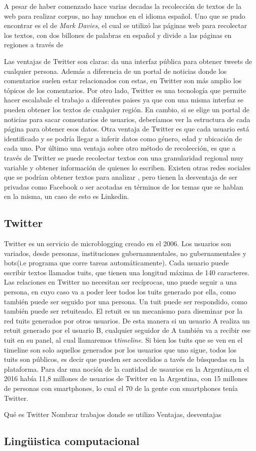 A pesar de haber comenzado hace varias decadas la recolección de textos de la web para realizar corpus, no hay muchos en el idioma español.
Uno que se pudo encontrar es el de \textit{Mark Davies}, el cual se utilizó las páginas web para recolectar los textos, con dos billones de palabras en español y divide a las páginas en regiones a través de  

Las ventajas de Twitter son claras: da una interfaz pública para obtener tweets de cualquier persona. Además a diferencia de un portal de noticias donde los comentarios suelen estar relacionados con estas, en Twitter son más amplio los tópicos de los comentarios.
Por otro lado, Twitter es una tecnología que permite hacer escalabale el trabajo a diferentes paises ya que con una misma interfaz se pueden obtener los textos de cualquier región. En cambio, si se elige un portal de noticias para sacar comentarios de usuarios, deberíamos ver la estructura de cada página para obtener esos datos.
Otra ventaja de Twitter es que cada usuario está identificado y se podría llegar a inferir datos como género, edad y ubicación de cada uno.
Por último una ventaja sobre otro método de recolección, es que a través de Twitter se puede recolectar textos con una granularidad regional muy variable y obtener información de quienes lo escriben.
Existen otras redes sociales que se podrían obtener textos para analizar , pero tienen la desventaja de ser privadas como Facebook o ser acotadas en términos de los temas que se hablan en la misma, un caso de esto es Linkedin. 


\subsection{Twitter}
Twitter es un servicio de microblogging creado en el 2006. Los usuarios son variados, desde personas, instituciones gubernamuentales, no gubernamentales y bots(i.e programa que corre tareas automáticamente). Cada usuario puede escribir textos llamados tuits, que tienen una longitud máxima de 140 caracteres. Las relaciones en Twitter no necesitan ser recíprocas, uno puede seguir a una persona, en cuyo caso va a poder leer todos los tuits generado por ella, como también puede ser seguido por una persona. Un tuit puede ser respondido, como también puede ser retuiteado. El retuit es un mecanismo para diseminar por la red tuits generados por otros usuarios. De esta manera si un usuario A realiza un retuit generado por el usuario B, cualquier seguidor de A también va a recibir ese tuit en su panel, al cual llamaremos t\textit{timeline}. Si bien los tuits que se ven en el timeline son solo aquellos generados por los usuarios que uno sigue, todos los tuits son públicos, es decir que pueden ser accedidos a tavés de búsquedas en la plataforma.
Para dar una noción de la cantidad de usaurios en la Argentina,en el 2016 había 11,8 millones de usuarios de Twitter en la Argentina, con 15 millones de personas con smartphones, lo cual el 70 de la gente con smartphones tenía Twitter.%

Qué es Twitter
Nombrar trabajos donde se utilizo
Ventajas, desventajas

\subsection{Lingüistica computacional} %
\label{sub:linguistica_computacional}

\cite{baayen2001word}
\cite{kilgarriff2003introduction}
\cite{mcenery2011corpus}

